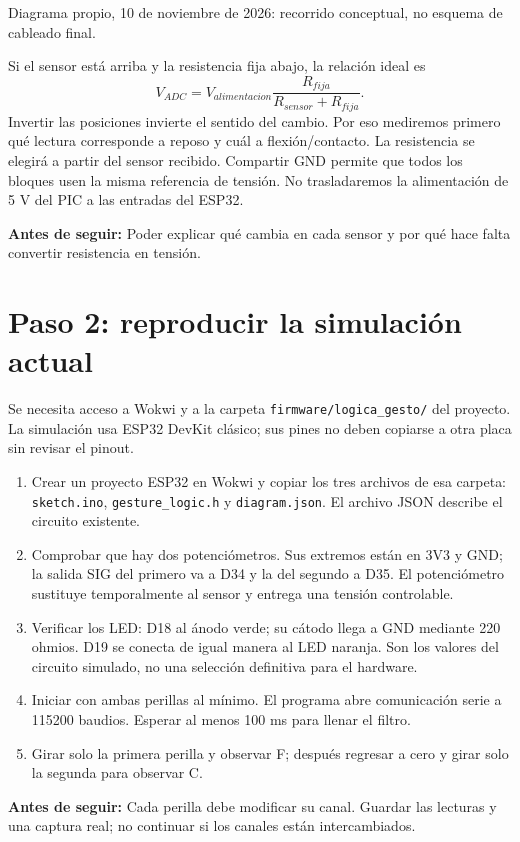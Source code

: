 \documentclass[11pt,a4paper]{article}
\newcommand{\comprobar}[1]{\par\smallskip\noindent\colorbox{suave}{\parbox{\dimexpr\linewidth-2\fboxsep}{\textbf{Antes de seguir:} #1}}\par\smallskip}
\begin{document}
\begin{center}
\end{center}
\noindent Diagrama propio, 10 de noviembre de 2026: recorrido conceptual, no esquema de cableado final.

Si el sensor está arriba y la resistencia fija abajo, la relación ideal es
\[V_{ADC}=V_{alimentacion}\frac{R_{fija}}{R_{sensor}+R_{fija}}.\]
Invertir las posiciones invierte el sentido del cambio. Por eso mediremos primero qué lectura corresponde a reposo y cuál a flexión/contacto. La resistencia se elegirá a partir del sensor recibido. Compartir GND permite que todos los bloques usen la misma referencia de tensión. No trasladaremos la alimentación de 5 V del PIC a las entradas del ESP32.
\comprobar{Poder explicar qué cambia en cada sensor y por qué hace falta convertir resistencia en tensión.}

\section{Paso 2: reproducir la simulación actual}
Se necesita acceso a Wokwi y a la carpeta \texttt{firmware/logica\_gesto/} del proyecto. La simulación usa ESP32 DevKit clásico; sus pines no deben copiarse a otra placa sin revisar el pinout.
\begin{enumerate}
\item Crear un proyecto ESP32 en Wokwi y copiar los tres archivos de esa carpeta: \texttt{sketch.ino}, \texttt{gesture\_logic.h} y \texttt{diagram.json}. El archivo JSON describe el circuito existente.
\item Comprobar que hay dos potenciómetros. Sus extremos están en 3V3 y GND; la salida SIG del primero va a D34 y la del segundo a D35. El potenciómetro sustituye temporalmente al sensor y entrega una tensión controlable.
\item Verificar los LED: D18 al ánodo verde; su cátodo llega a GND mediante 220 ohmios. D19 se conecta de igual manera al LED naranja. Son los valores del circuito simulado, no una selección definitiva para el hardware.
\item Iniciar con ambas perillas al mínimo. El programa abre comunicación serie a 115200 baudios. Esperar al menos 100 ms para llenar el filtro.
\item Girar solo la primera perilla y observar F; después regresar a cero y girar solo la segunda para observar C.
\end{enumerate}
\comprobar{Cada perilla debe modificar su canal. Guardar las lecturas y una captura real; no continuar si los canales están intercambiados.}
\end{document}
